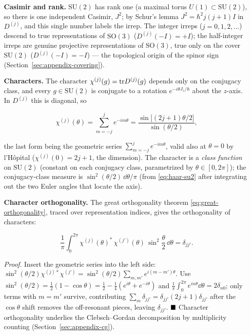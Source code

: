 \medskip\noindent\textbf{Casimir and rank.} $\mathrm{SU}(2)$ has rank one (a maximal torus $U(1)\subset\mathrm{SU}(2)$), so there is one independent Casimir, $J^{2}$; by Schur's lemma $J^{2}=\hbar^{2}j(j+1)I$ in $D^{(j)}$, and this single number labels the irrep. The integer irreps ($j=0,1,2,\ldots$) descend to true representations of $\mathrm{SO}(3)$ ($D^{(j)}(-I)=+I$); the half-integer irreps are genuine projective representations of $\mathrm{SO}(3)$, true only on the cover $\mathrm{SU}(2)$ ($D^{(j)}(-I)=-I$) --- the topological origin of the spinor sign (Section~\ref{sec:appendix-covering}).

\medskip\noindent\textbf{Characters.} The character $\chi^{(j)}(g)=\mathrm{tr} D^{(j)}(g)$ depends only on the conjugacy class, and every $g\in\mathrm{SU}(2)$ is conjugate to a rotation $e^{-i\theta J_{z}/\hbar}$ about the $z$-axis. In $D^{(j)}$ this is diagonal, so
\begin{linenomath}
\begin{equation}
\chi^{(j)}(\theta)=\sum_{m=-j}^{j}e^{-im\theta}=\frac{\sin\!\bigl[(2j+1)\theta/2\bigr]}{\sin(\theta/2)},
\label{eq:su2-character}
\end{equation}
\end{linenomath}
the last form being the geometric series $\sum_{m=-j}^{j}e^{-im\theta}$, valid also at $\theta=0$ by l'H\^opital ($\chi^{(j)}(0)=2j+1$, the dimension). The character is a \emph{class function} on $\mathrm{SU}(2)$ (constant on each conjugacy class, parametrized by $\theta\in[0,2\pi]$); the conjugacy-class measure is $\sin^{2}(\theta/2)\,\dd\theta/\pi$ (from \eqref{eq:haar-su2} after integrating out the two Euler angles that locate the axis).

\medskip\noindent\textbf{Character orthogonality.} The great orthogonality theorem \eqref{eq:great-orthogonality}, traced over representation indices, gives the orthogonality of characters:
\begin{linenomath}
\begin{equation}
\frac{1}{\pi}\int_{0}^{2\pi}\chi^{(j)}(\theta)^{*}\,\chi^{(j')}(\theta)\,\sin^{2}\!\frac{\theta}{2}\,\dd\theta=\delta_{jj'}.
\label{eq:character-orthogonality}
\end{equation}
\end{linenomath}
\emph{Proof.} Insert the geometric series into the left side: $\sin^{2}(\theta/2)\chi^{(j)*}\chi^{(j')}=\sin^{2}(\theta/2)\sum_{m,m'}e^{i(m-m')\theta}$. Use $\sin^{2}(\theta/2)=\tfrac12(1-\cos\theta)=\tfrac12-\tfrac14(e^{i\theta}+e^{-i\theta})$ and $\frac1\pi\int_{0}^{2\pi}e^{in\theta}\dd\theta=2\delta_{n0}$; only terms with $m=m'$ survive, contributing $\sum_{m}\delta_{jj'}=\delta_{jj'}(2j+1)\delta_{jj'}$ after the $\cos\theta$ shift removes the off-resonant pieces, leaving $\delta_{jj'}$. $\hfill\blacksquare$ Character orthogonality underlies the Clebsch--Gordan decomposition by multiplicity counting (Section~\ref{sec:appendix-cg}).


